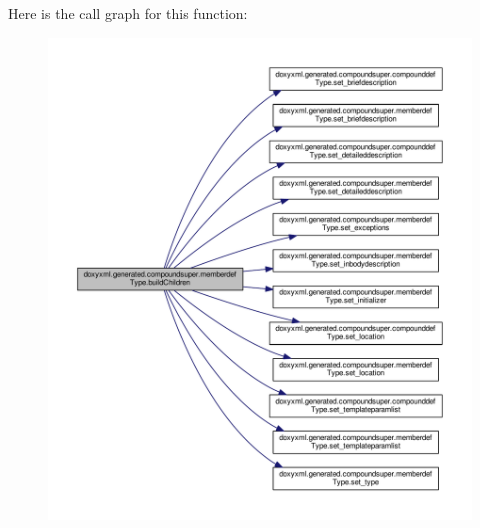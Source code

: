 Here is the call graph for this function\+:
\nopagebreak
\begin{figure}[H]
\begin{center}
\leavevmode
\includegraphics[width=350pt]{de/d3a/classdoxyxml_1_1generated_1_1compoundsuper_1_1memberdefType_aa2b57539b704f0c9b6ede20c0551aee7_cgraph}
\end{center}
\end{figure}




